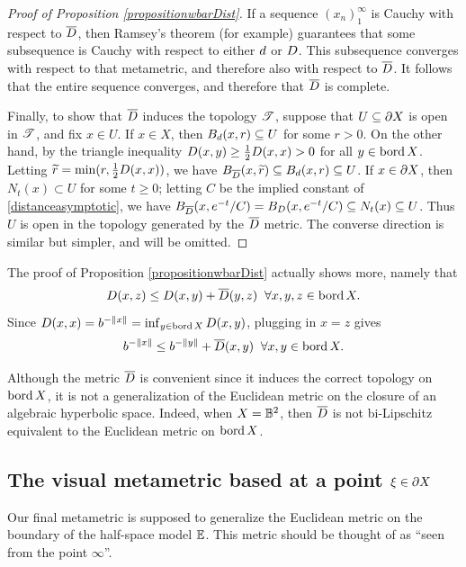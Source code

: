 \begin{proof}[Proof of Proposition \ref{propositionwbarDist}]
If a sequence $(x_n)_1^\infty$ is Cauchy with respect to $\overline{D}$, then Ramsey's theorem (for example) guarantees that some subsequence is Cauchy with respect to either $d$ or $D$. This subsequence converges with respect to that metametric, and therefore also with respect to $\overline{D}$. It follows that the entire sequence converges, and therefore that $\overline{D}$ is complete.

Finally, to show that $\overline{D}$ induces the topology $\mathscr T$, suppose that $U\subseteq\partial X$ is open in $\mathscr T$, and fix $x\in U$. If $x\in X$, then $B_d(x,r)\subseteq U$ for some $r > 0$. On the other hand, by the triangle inequality $D(x,y) \geq \frac12D(x,x) > 0$ for all $y\in\operatorname{bord} X$. Letting $\widetilde r = \min(r, \frac12D(x,x))$, we have $B_{\overline{D}}(x,\widetilde r) \subseteq B_d(x,r) \subseteq U$. If $x\in\partial X$, then $N_t(x)\subset U$ for some $t\geq 0$; letting $C$ be the implied constant of \eqref{distanceasymptotic}, we have $B_{\overline{D}}(x,e^{-t}/C) = B_D(x,e^{-t}/C) \subseteq N_t(x) \subseteq U$. Thus $U$ is open in the topology generated by the $\overline{D}$ metric. The converse direction is similar but simpler, and will be omitted.
\end{proof}

\begin{remark}
\label{remarkDistunifcont}
The proof of Proposition \ref{propositionwbarDist} actually shows more, namely that
\[
D(x,z) \leq D(x,y) + \overline{D}(y,z) \;\;\forall x,y,z\in\operatorname{bord} X.
\]
Since $D(x,x) = b^{-\|x\|} = \inf_{y\in\operatorname{bord} X} D(x,y)$, plugging in $x = z$ gives
\[
b^{-\|x\|} \leq b^{-\|y\|} + \overline{D}(x,y) \;\;\forall x,y\in\operatorname{bord} X.
\]
\end{remark}

\begin{remark}
Although the metric $\overline{D}$ is convenient since it induces the correct topology on $\operatorname{bord} X$, it is not a generalization of the Euclidean metric on the closure of an algebraic hyperbolic space. Indeed, when $X = \B^2$, then $\overline{D}$ is not bi-Lipschitz equivalent to the Euclidean metric on $\operatorname{bord} X$.
\end{remark}




\subsection{The visual metametric based at a point $\xi\in\partial X$}
Our final metametric is supposed to generalize the Euclidean metric on the boundary of the half-space model $\E$. This metric should be thought of as ``seen from the point $\infty$''.

